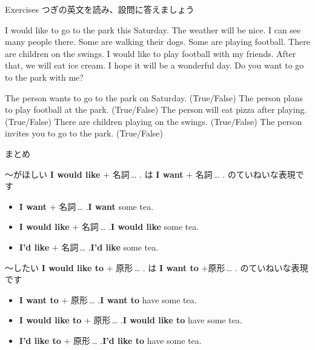 \documentclass[aspectratio=169,xcolor={dvipsnames,table}]{beamer}
\begin{document}
\begin{frame}[plain]{Exercises}
つぎの英文を読み、設問に答えましょう
 \begin{tcolorbox}[colframe=NavyBlue!20,
  colback=NavyBlue!10!white,
  colbacktitle=NavyBlue!40!white,
  coltitle=black, fonttitle=\bfseries,
  title=A Day at the Park]
I would like to go to the park this Saturday. The weather will be nice. I can see many people there. Some are walking their dogs. Some are playing football. There are children on the swings. I would like to play football with my friends. After that, we will eat ice cream. I hope it will be a wonderful day. Do you want to go to the park with me?
\end{tcolorbox}
The person wants to go to the park on Saturday. (True/False)
The person plans to play football at the park. (True/False)
The person will eat pizza after playing. (True/False)
There are children playing on the swings. (True/False)
The person invites you to go to the park. (True/False)

\end{frame}
\begin{frame}[plain]{まとめ}
 \begin{block}{～がほしい}\small
\textbf{I would like} $+$ 名詞\,\ldots\,\,.\,\,は\,\,\textbf{I want} $+$ 名詞\,\ldots\,\,.\,\,のていねいな表現です
\begin{itemize}[square]\small
 \item \textbf{I want} $+$ 名詞\,\ldots\,\,.\hfill{\scriptsize \textbf{I want} some tea.}
 \item \textbf{I would like} $+$ 名詞\,\ldots\,\,.\hfill{\scriptsize \textbf{I would like} some tea.}
 \item \textbf{I'd like} $+$ 名詞\,\ldots\,\,.\hfill{\scriptsize \textbf{I'd like} some tea.}
       \end{itemize}
\end{block}

\begin{block}{～したい}\small
\textbf{I would like to} $+$ 原形\,\ldots\,\,.\,\,は\,\,\textbf{I want to} $+$原形\,\ldots\,\,.\,\,のていねいな表現です
\begin{itemize}[square]\small
 \item \textbf{I want to} $+$ 原形\,\ldots\,\,.\hfill{\scriptsize \textbf{I want to} have some tea.}
 \item \textbf{I would like to} $+$ 原形\,\ldots\,\,.\hfill{\scriptsize \textbf{I would like to} have some tea.}
 \item \textbf{I'd like to} $+$ 原形\,\ldots\,\,.\hfill{\scriptsize \textbf{I'd like to} have some tea.}
       \end{itemize}
\end{block}
\end{frame}
\end{document}
